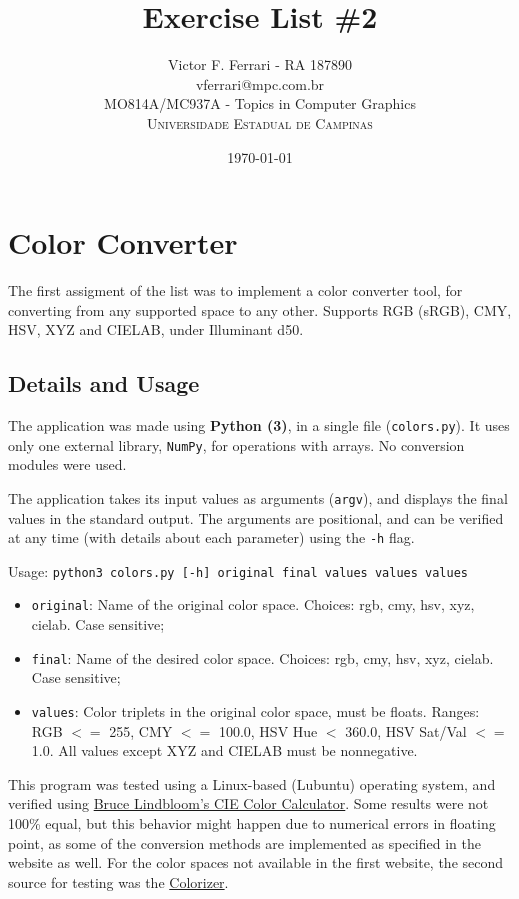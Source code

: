 \documentclass[12pt]{article}
\title{Exercise List \#2} %
\author{Victor F. Ferrari - RA 187890\\ %
vferrari@mpc.com.br\\
MO814A/MC937A - Topics in Computer Graphics\\ %
\textsc{Universidade Estadual de Campinas}
}
\date{\today} %
\begin{document}
\setlength{\droptitle}{-5em}    
\maketitle


\section{Color Converter}

The first assigment of the list was to implement a color converter tool, for converting from any supported space to any other. Supports RGB (sRGB), CMY, HSV, XYZ and CIELAB, under Illuminant d50.

\subsection{Details and Usage}
The application was made using \textbf{Python (3)}, in a single file (\texttt{colors.py}). It uses only one external library, \texttt{NumPy}, for operations with arrays. No conversion modules were used. 

The application takes its input values as arguments (\texttt{argv}), and displays the final values in the standard output. The arguments are positional, and can be verified at any time (with details about each parameter) using the \texttt{-h} flag.

Usage: \texttt{python3 colors.py [-h] original final values values values}
\begin{itemize}
        \item \texttt{original}: Name of the original color space. Choices: rgb, cmy, hsv, xyz, cielab. Case sensitive;
        \item \texttt{final}: Name of the desired color space. Choices: rgb, cmy, hsv, xyz, cielab. Case sensitive;
        \item \texttt{values}: Color triplets in the original color space, must be floats. Ranges: RGB $<=$ 255, CMY $<=$ 100.0, HSV Hue $<$ 360.0, HSV Sat/Val $<=$ 1.0. All values except XYZ and CIELAB must be nonnegative. 
\end{itemize}

This program was tested using a Linux-based (Lubuntu) operating system, and verified using \href{http://www.brucelindbloom.com/index.html?ColorCalculator.html}{Bruce Lindbloom's CIE Color Calculator}. Some results were not 100\% equal, but this behavior might happen due to numerical errors in floating point, as some of the conversion methods are implemented as specified in the website as well. For the color spaces not available in the first website, the second source for testing was the \href{http://colorizer.org/}{Colorizer}.
\end{document}
